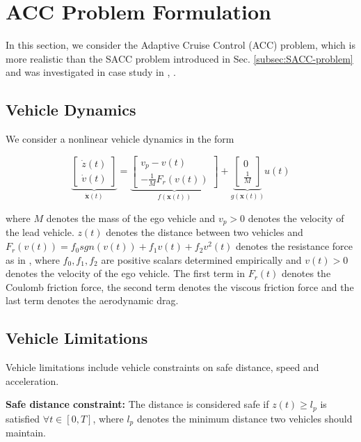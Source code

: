 \section{ACC Problem Formulation}
\label{sec:ACC-Problem}

In this section, we consider the Adaptive Cruise Control (ACC) problem, which is more realistic than the SACC problem introduced in Sec. \ref{subsec:SACC-problem} and was investigated in case study in \cite{ames2016control}, \cite{xiao2021adaptive}.
\subsection{Vehicle Dynamics}
We consider a nonlinear vehicle dynamics in the form
\begin{small}
\begin{equation}
\label{eq:ACC-dynamics}
\underbrace{\begin{bmatrix}
\dot{z}(t) \\
\dot{v}(t) 
\end{bmatrix}}_{\dot{\boldsymbol{x}}(t)}  
=\underbrace{\begin{bmatrix}
 v_{p}-v(t) \\
 -\frac{1}{M}F_{r}(v(t))
\end{bmatrix}}_{f(\boldsymbol{x}(t))} 
+ \underbrace{\begin{bmatrix}
  0 \\
  \frac{1}{M} 
\end{bmatrix}}_{g(\boldsymbol{x}(t))}u(t)
\end{equation}
\end{small}
where $M$ denotes the mass of the ego vehicle and $v_{p}>0$ denotes the velocity of the lead vehicle. $z(t)$ denotes the distance between two vehicles and $F_{r}(v(t))=f_{0}sgn(v(t))+f_{1}v(t)+f_{2}v^{2}(t)$ denotes the resistance force as in \cite{Khalil:1173048}, where $f_{0},f_{1},f_{2}$ are positive scalars determined empirically and $v(t)>0$ denotes the velocity of the ego vehicle. The first term in $F_{r}(t)$ denotes the Coulomb friction force, the second term denotes the viscous friction force and the last term denotes the aerodynamic drag.
\subsection{Vehicle Limitations}
Vehicle limitations include vehicle constraints on safe distance, speed and acceleration.

\textbf{Safe distance constraint:} The distance is considered safe if $z(t)\ge l_{p}$ is satisfied $\forall t \in [0,T]$, where $l_{p}$ denotes the minimum distance two vehicles should maintain.

